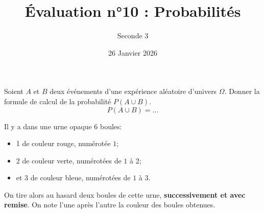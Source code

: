 \documentclass{controle}
\title{Évaluation n°10 : Probabilités}
\author{Seconde 3}
\date{26 Janvier 2026}
\begin{document}
\titleandname{}
\version
\begin{questions}
\question[2] \hfill 

\vspace*{0.1cm}
Soient $A$ et $B$ deux événements d'une expérience aléatoire d'univers $\Omega$. Donner la formule de calcul de la probabilité $P(A \cup B)$.
\begin{equation*}
P(A \cup B) = \dots
\end{equation*}

\vspace*{0.25cm}
\question[8] \hfill

\vspace*{0.1cm}
Il y a dans une urne opaque \num{6} boules:
\begin{itemize}
\item \num{1} de couleur rouge, numérotée $1$;
\item \num{2} de couleur verte, numérotées de $1$ à $2$;
\item et \num{3} de couleur bleue, numérotées de $1$ à $3$. 
\end{itemize}
On tire alors au hasard deux boules de cette urne, \textbf{successivement et avec remise}. On note l'une après l'autre la couleur des boules obtenues.
\end{questions}
\end{document}
